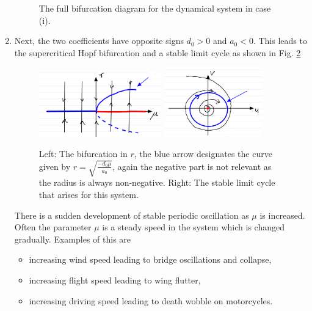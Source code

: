 \begin{enumerate}
\begin{figure}[h!]
			\caption{The full bifurcation diagram for the dynamical system in case (i).}
			\label{fig:case1_full_bif}
		\end{figure}
	\item Next, the two coefficients have opposite signs $d_0 > 0$ and $a_0 <0$. This leads to the supercritical Hopf bifurcation and a stable limit cycle as shown in Fig. \ref{fig:case2_bif}
		\begin{figure}[h!]
			\centering
			\includegraphics[width=0.5\textwidth]{figures/ch3/23case2_bif.png}
			\includegraphics[width=0.4\textwidth]{figures/ch3/22case2_r_bif.png}
			\caption{Left: The bifurcation in $r$, the blue arrow designates the curve given by $r=\sqrt{\frac{-d_0 \mu }{a_0}}$, again the negative part is not relevant as the radius is always non-negative. Right: The stable limit cycle that arises for this system.}
			\label{fig:case2_bif}
		\end{figure}
	
		There is a sudden development of stable periodic oscillation as $\mu  $ is increased. Often the parameter $\mu $ is a steady speed in the system which is changed gradually. Examples of this are 
		\begin{itemize}
			\item increasing wind speed leading to bridge oscillations and collapse,
			\item increasing flight speed leading to wing flutter,
			\item increasing driving speed leading to death wobble on motorcycles.
		\end{itemize}
		
\end{enumerate}

